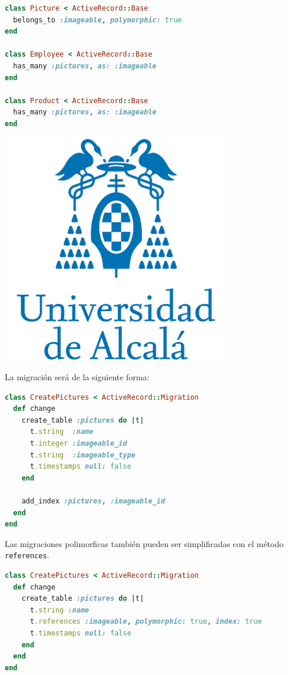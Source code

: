 \begin{lstlisting}[language=Ruby]
class Picture < ActiveRecord::Base
  belongs_to :imageable, polymorphic: true
end
 
class Employee < ActiveRecord::Base
  has_many :pictures, as: :imageable
end
 
class Product < ActiveRecord::Base
  has_many :pictures, as: :imageable
end
\end{lstlisting}

\includegraphics[width=10cm]{./image/logos/uahlogo3.png}

La migración será de la siguiente forma:

\begin{lstlisting}[language=Ruby]
class CreatePictures < ActiveRecord::Migration
  def change
    create_table :pictures do |t|
      t.string  :name
      t.integer :imageable_id
      t.string  :imageable_type
      t.timestamps null: false
    end
 
    add_index :pictures, :imageable_id
  end
end
\end{lstlisting}

Las migraciones polimorficas también pueden ser simplificadas con el método \texttt{references}.

\begin{lstlisting}[language=Ruby]
class CreatePictures < ActiveRecord::Migration
  def change
    create_table :pictures do |t|
      t.string :name
      t.references :imageable, polymorphic: true, index: true
      t.timestamps null: false
    end
  end
end
\end{lstlisting}



